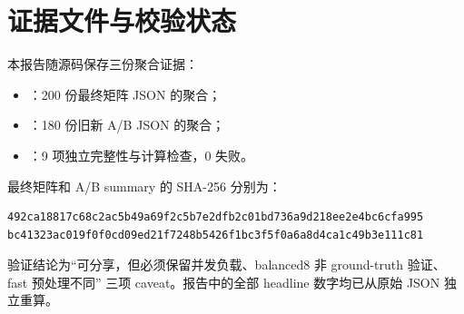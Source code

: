 \documentclass[UTF8,a4paper,11pt,fontset=none]{ctexart}
\begin{document}
\section{证据文件与校验状态}

本报告随源码保存三份聚合证据：

\begin{itemize}
  \item {}：200 份最终矩阵 JSON 的聚合；
  \item {}：180 份旧新 A/B JSON 的聚合；
  \item {}：9 项独立完整性与计算检查，0 失败。
\end{itemize}

最终矩阵和 A/B summary 的 SHA-256 分别为：

\begin{lstlisting}[style=reportcode]
492ca18817c68c2ac5b49a69f2c5b7e2dfb2c01bd736a9d218ee2e4bc6cfa995
bc41323ac019f0f0cd09ed21f7248b5426f1bc3f5f0a6a8d4ca1c49b3e111c81
\end{lstlisting}

验证结论为“可分享，但必须保留并发负载、balanced8 非 ground-truth 验证、fast 预处理不同”
三项 caveat。报告中的全部 headline 数字均已从原始 JSON 独立重算。
\end{document}
